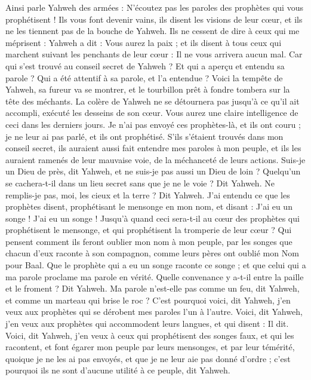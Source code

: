 \begin{multicols}{2}
Ainsi parle Yahweh des armées : N'écoutez pas les paroles des prophètes qui vous prophétisent ! Ils vous font devenir vains, ils disent les visions de leur cœur, et ils ne les tiennent pas de la bouche de Yahweh.
Ils ne cessent de dire à ceux qui me méprisent : Yahweh a dit : Vous aurez la paix ; et ils disent à tous ceux qui marchent suivant les penchants de leur cœur : Il ne vous arrivera aucun mal.
Car qui s'est trouvé au conseil secret de Yahweh ? Et qui a aperçu et entendu sa parole ? Qui a été attentif à sa parole, et l'a entendue ?
Voici la tempête de Yahweh, sa fureur va se montrer, et le tourbillon prêt à fondre tombera sur la tête des méchants.
La colère de Yahweh ne se détournera pas jusqu'à ce qu'il ait accompli, exécuté les desseins de son cœur. Vous aurez une claire intelligence de ceci dans les derniers jours.
Je n'ai pas envoyé ces prophètes-là, et ils ont couru ; je ne leur ai pas parlé, et ils ont prophétisé.
S'ils s'étaient trouvés dans mon conseil secret, ils auraient aussi fait entendre mes paroles à mon peuple, et ils les auraient ramenés de leur mauvaise voie, de la méchanceté de leurs actions.
Suis-je un Dieu de près, dit Yahweh, et ne suis-je pas aussi un Dieu de loin ?
Quelqu'un se cachera-t-il dans un lieu secret sans que je ne le voie ? Dit Yahweh. Ne remplis-je pas, moi, les cieux et la terre ? Dit Yahweh.
J'ai entendu ce que les prophètes disent, prophétisant le mensonge en mon nom, et disant : J'ai eu un songe ! J'ai eu un songe !
Jusqu'à quand ceci sera-t-il au cœur des prophètes qui prophétisent le mensonge, et qui prophétisent la tromperie de leur cœur ?
Qui pensent comment ils feront oublier mon nom à mon peuple, par les songes que chacun d'eux raconte à son compagnon, comme leurs pères ont oublié mon Nom pour Baal.
Que le prophète qui a eu un songe raconte ce songe ; et que celui qui a ma parole proclame ma parole en vérité. Quelle convenance y a-t-il entre la paille et le froment ? Dit Yahweh.
Ma parole n'est-elle pas comme un feu, dit Yahweh, et comme un marteau qui brise le roc ?
C'est pourquoi voici, dit Yahweh, j'en veux aux prophètes qui se dérobent mes paroles l'un à l'autre.
Voici, dit Yahweh, j'en veux aux prophètes qui accommodent leurs langues, et qui disent : Il dit.
Voici, dit Yahweh, j'en veux à ceux qui prophétisent des songes faux, et qui les racontent, et font égarer mon peuple par leurs mensonges, et par leur témérité, quoique je ne les ai pas envoyés, et que je ne leur aie pas donné d'ordre ; c'est pourquoi ils ne sont d'aucune utilité à ce peuple, dit Yahweh.

\end{multicols}
